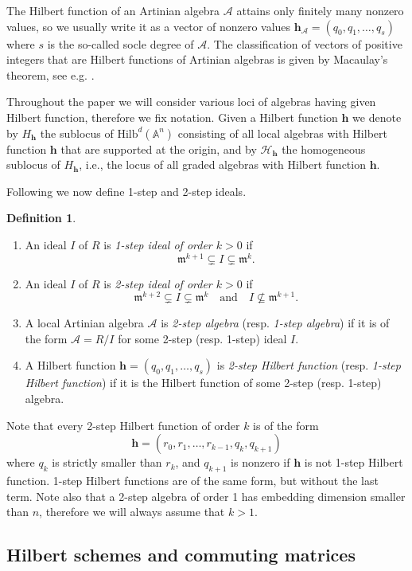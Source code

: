 \documentclass[11pt]{amsart}
\theoremstyle{definition}
\newtheorem{defin}[thm]{Definition}
\newcommand{\A}{\mathbb{A}}
\newcommand{\m}{\mathfrak{m}}
\newcommand{\Hilb}[2]{\mathrm{Hilb}^{#1}(\A^{#2})}
\newcommand{\h}{\mathbf{h}}
\newcommand{\cH}{\mathscr{H}}
\newcommand{\cA}{\mathcal{A}}
\begin{document}
The Hilbert function of an Artinian algebra $\cA$ attains only finitely many nonzero values, so we usually write it as a vector of nonzero values $\h_\cA=(q_0,q_1,\ldots ,q_s)$ where $s$ is the so-called socle degree of $\cA$. The classification of vectors of positive integers that are Hilbert functions of Artinian algebras is given by Macaulay's theorem, see e.g. \cite[Theorem 4.2.10]{BH}.

Throughout the paper we will consider various loci of algebras having given Hilbert function, therefore we fix notation. Given a Hilbert function $\h$ we denote by $H_\h$ the sublocus of $\Hilb{d}{n}$ consisting of all local algebras with Hilbert function $\h$ that are supported at the origin, and by $\cH_\h$ the homogeneous sublocus of $H_\h$, i.e., the locus of all graded algebras with Hilbert function $\h$.

Following \cite{GGGL} we now define 1-step and 2-step ideals.

\begin{defin}
\begin{enumerate}
\item
An ideal $I$ of $R$ is {\em 1-step ideal of order $k>0$} if
$$\m^{k+1}\subsetneq I\subsetneq \m^k.$$
\item
An ideal $I$ of $R$ is {\em 2-step ideal of order $k>0$} if
$$\m^{k+2}\subsetneq I\subsetneq \m^k\quad \mathrm{and}\quad I\not\subseteq \m^{k+1}.$$
\item
A local Artinian algebra $\cA$ is {\em 2-step algebra} (resp. {\em 1-step algebra}) if it is of the form $\cA=R/I$ for some 2-step (resp. 1-step) ideal $I$.
\item
A Hilbert function $\h=(q_0,q_1,\ldots ,q_s)$ is {\em 2-step Hilbert function} (resp. {\em 1-step Hilbert function}) if it is the Hilbert function of some 2-step (resp. 1-step) algebra.
\end{enumerate}
\end{defin}

Note that every 2-step Hilbert function of order $k$ is of the form
$$\h=(r_0,r_1,\ldots ,r_{k-1},q_k,q_{k+1})$$
where $q_k$ is strictly smaller than $r_k$, and $q_{k+1}$ is nonzero if $\h$ is not 1-step Hilbert function. 1-step Hilbert functions are of the same form, but without the last term. Note also that a 2-step algebra of order 1 has embedding dimension smaller than $n$, therefore we will always assume that $k>1$.

\subsection{Hilbert schemes and commuting matrices}
\end{document}
